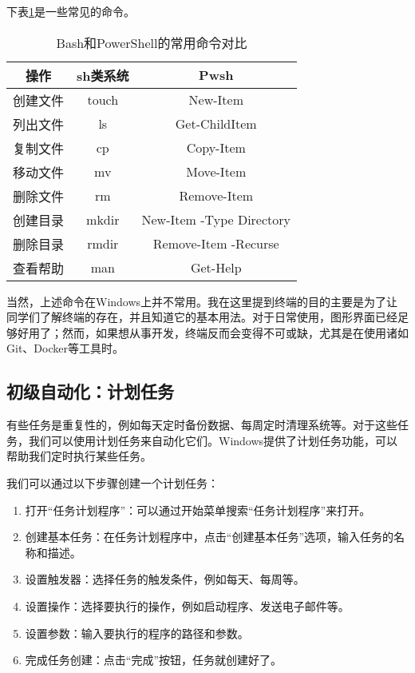 下表\ref{tab:terminal-commands}是一些常见的命令。

\begin{table}[ht]
  \centering
  \begin{tabular}{c|cc}
    \hline
    \textbf{操作} & \textbf{\*sh类系统} & \textbf{Pwsh} \\
    \hline
    创建文件 & touch & New-Item \\
    列出文件 & ls & Get-ChildItem \\
    复制文件 & cp & Copy-Item \\
    移动文件 & mv & Move-Item \\
    删除文件 & rm & Remove-Item \\
    创建目录 & mkdir & New-Item -Type Directory \\
    删除目录 & rmdir & Remove-Item -Recurse \\
    查看帮助 & man & Get-Help \\
    \hline
  \end{tabular}
  \caption{Bash和PowerShell的常用命令对比}
  \label{tab:terminal-commands}
\end{table}

当然，上述命令在Windows上并不常用。我在这里提到终端的目的主要是为了让同学们了解终端的存在，并且知道它的基本用法。对于日常使用，图形界面已经足够好用了；然而，如果想从事开发，终端反而会变得不可或缺，尤其是在使用诸如Git、Docker等工具时。

\subsection{初级自动化：计划任务}

有些任务是重复性的，例如每天定时备份数据、每周定时清理系统等。对于这些任务，我们可以使用计划任务来自动化它们。Windows提供了计划任务功能，可以帮助我们定时执行某些任务。

我们可以通过以下步骤创建一个计划任务：
\begin{enumerate}
  \item 打开“任务计划程序”：可以通过开始菜单搜索“任务计划程序”来打开。
  \item 创建基本任务：在任务计划程序中，点击“创建基本任务”选项，输入任务的名称和描述。
  \item 设置触发器：选择任务的触发条件，例如每天、每周等。
  \item 设置操作：选择要执行的操作，例如启动程序、发送电子邮件等。
  \item 设置参数：输入要执行的程序的路径和参数。
  \item 完成任务创建：点击“完成”按钮，任务就创建好了。
\end{enumerate}


